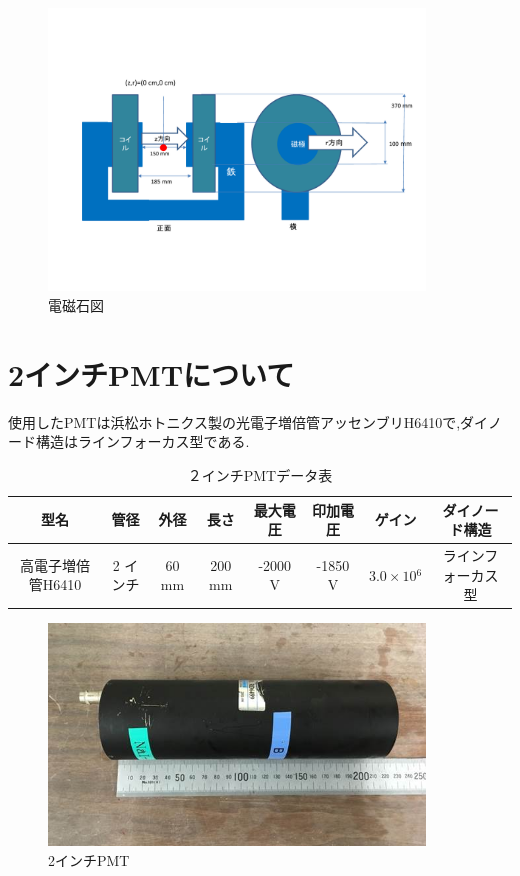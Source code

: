 \begin{figure}[H]
	\centering
		\includegraphics[width=10cm]{fig/iguchi/magnetfigure.pdf}
	\caption{電磁石図}
	\label{magnetfigure}
\end{figure}

\section{2インチPMTについて}
使用したPMTは浜松ホトニクス製の光電子増倍管アッセンブリH6410で,ダイノード構造はラインフォーカス型である.\cite{pmtH6410}
\begin{table}[htb]
	\centering
	
	  \begin{tabular}{cccccccc}\hline
		型名& 管径 & 外径 & 長さ & 最大電圧 & 印加電圧 & ゲイン & ダイノード構造 \\ \hline \hline
		高電子増倍管H6410 & 2 インチ & 60 mm & 200 mm & -2000 V & -1850 V & $3.0\times10{^{6}}$ &ラインフォーカス型 \\ \hline
	\end{tabular}
	  \caption{２インチPMTデータ表}
\end{table}

\begin{figure}[H]
	\centering
		\includegraphics[width=10cm]{fig/iguchi/PMTphoto.jpg}
	\caption{2インチPMT}
	\label{PMTphoto}
\end{figure}

